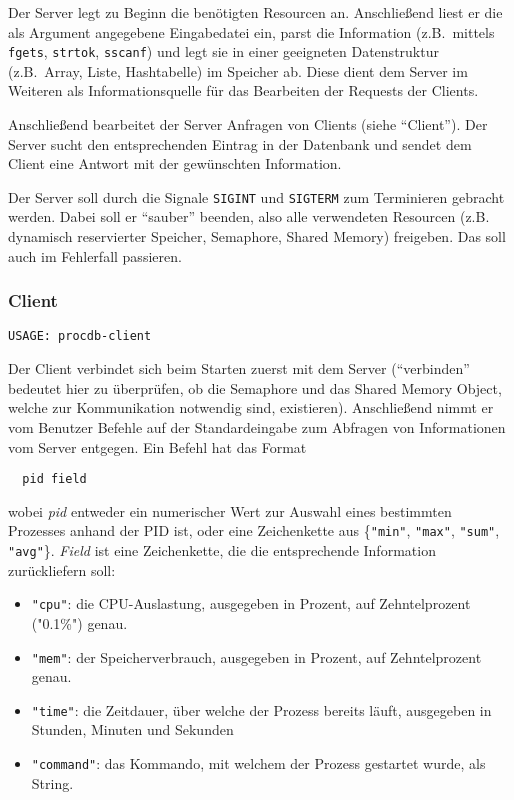 Der Server legt zu Beginn die benötigten Resourcen an. Anschließend liest er
die als Argument angegebene Eingabedatei ein, parst die Information (z.B.\
mittels \texttt{fgets}, \texttt{strtok}, \texttt{sscanf}) und legt sie in einer
geeigneten Datenstruktur (z.B.\ Array, Liste, Hashtabelle) im Speicher ab.
Diese dient dem Server im Weiteren als Informationsquelle für das Bearbeiten
der Requests der Clients.

Anschließend bearbeitet der Server Anfragen von Clients (siehe "`Client"'). Der
Server sucht den entsprechenden Eintrag in der Datenbank und sendet dem Client
eine Antwort mit der gewünschten Information.


Der Server soll durch die Signale \texttt{SIGINT} und \texttt{SIGTERM} zum
Terminieren gebracht werden. Dabei soll er "`sauber"' beenden, also alle
verwendeten Resourcen (z.B. dynamisch reservierter Speicher, Semaphore, Shared
Memory) freigeben. Das soll auch im Fehlerfall passieren.


\subsubsection*{Client}
\begin{verbatim}
USAGE: procdb-client
\end{verbatim}


Der Client verbindet sich beim Starten zuerst mit dem Server ("`verbinden"'
bedeutet hier zu überprüfen, ob die Semaphore und das Shared Memory Object,
welche zur Kommunikation notwendig sind, existieren). Anschließend nimmt er vom
Benutzer Befehle auf der Standardeingabe zum Abfragen von Informationen vom
Server entgegen. Ein Befehl hat das Format

\begin{verbatim}
  pid field
\end{verbatim}

wobei \emph{pid} entweder ein numerischer Wert zur Auswahl eines bestimmten
Prozesses anhand der PID ist, oder eine Zeichenkette aus \{\texttt{"{}min"},
\texttt{"{}max"}, \texttt{"{}sum"}, \texttt{"{}avg"}\}.
\emph{Field} ist eine Zeichenkette, die die entsprechende Information
zurückliefern soll:

\begin{itemize}
  \item \texttt{"{}cpu"{}}: die CPU-Auslastung, ausgegeben in Prozent, auf
    Zehntelprozent ("{}0.1\%"{}) genau.
  \item \texttt{"{}mem"{}}: der Speicherverbrauch, ausgegeben in Prozent, auf
    Zehntelprozent genau.
  \item \texttt{"{}time"{}}: die Zeitdauer, über welche der Prozess bereits
    läuft, ausgegeben in Stunden, Minuten und Sekunden
  \item \texttt{"{}command"{}}: das Kommando, mit welchem der Prozess
    gestartet wurde, als String.
\end{itemize}

